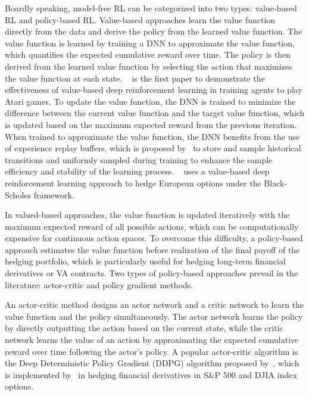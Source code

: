 Boardly speaking, model-free RL can be categorized into two types: value-based RL and policy-based RL.
Value-based approaches learn the value function directly from the data and derive the policy from the learned value function. 
The value function is learned by training a DNN to approximate the value function, which quantifies the expected cumulative reward over time. 
The policy is then derived from the learned value function by selecting the action that maximizes the value function at each state. 
~\cite{mnih2015human} is the first paper to demonstrate the effectiveness of value-based deep reinforcement learning in training agents to play Atari games.
To update the value function, the DNN is trained to minimize the difference between the current value function and the target value function, which is updated based on the maximum expected reward from the previous iteration.
When trained to approximate the value function, the DNN benefits from the use of experience replay buffers, which is proposed by~\cite{lin1992self} to store and sample historical transitions and uniformly sampled during training to enhance the sample efficiency and stability of the learning process.
~\cite{kolm2019dynamic} uses a value-based deep reinforcement learning approach to hedge European options under the Black-Scholes framework.

In valued-based approaches, the value function is updated iteratively with the maximum expected reward of all possible actions, which can be computationally expensive for continuous action spaces.
To overcome this difficulty, a policy-based approach estimates the value function before realization of the final payoff of the hedging portfolio, which is particularly useful for hedging long-term financial derivatives or VA contracts.
Two types of policy-based approaches prevail in the literature: actor-critic and policy gradient methods.

An actor-critic method designs an actor network and a critic network to learn the value function and the policy simultaneously.
The actor network learns the policy by directly outputting the action based on the current state, while the critic network learns the value of an action by approximating the expected cumulative reward over time following the actor's policy.
A popular actor-critic algorithm is the Deep Deterministic Policy Gradient (DDPG) algorithm proposed by~\cite{lillicrap2015continuous}, which is implemented by~\cite{xu2022delta} in hedging financial derivatives in S\&P 500 and DJIA index options.

